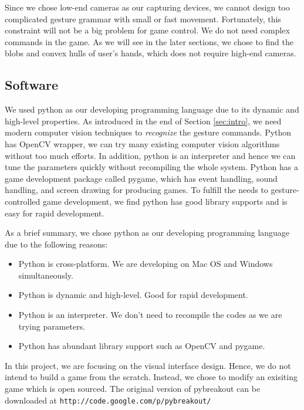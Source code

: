 \documentclass[10pt,twocolumn,letterpaper]{article}
\begin{document}
Since we chose low-end cameras as our capturing devices, we cannot design too 
complicated gesture grammar with small or fast movement. Fortunately, this 
constraint will not be a big problem for game control. We do not need complex 
commands in the game. As we will see in the later sections, we chose to find the 
blobs and convex hulls of user's hands, which does not require high-end cameras. 

\subsection{Software}
We used python as our developing programming language due to 
its dynamic and high-level properties. As introduced in the end 
of Section \ref{sec:intro}, we need modern computer vision 
techniques to \emph{recognize} the gesture commands. 
Python has OpenCV wrapper, we can try many existing computer vision 
algorithms without too much efforts. In addition, python 
is an interpreter and hence we can tune 
the parameters quickly without recompiling the whole system. 
Python has a game development package called pygame, which 
has event handling, sound handling, and screen drawing for producing 
games. To fulfill the needs to gesture-controlled game development, 
we find python has good library supports and is easy for rapid development.

As a brief summary, we chose python as our developing programming 
language due to the following reasons:
\begin{itemize}
	\item Python is cross-platform. We are developing on Mac OS and Windows simultaneously.
	\item Python is dynamic and high-level. Good for rapid development.
	\item Python is an interpreter. We don't need to recompile the codes as we are trying parameters.
	\item Python has abundant library support such as OpenCV and pygame. 
\end{itemize}

In this project, we are focusing on the visual interface 
design. Hence, we do not intend to build a game from the scratch. 
Instead, we chose to modify an exisiting game which is open sourced. 
The original version of pybreakout can be downloaded at
\verb"http://code.google.com/p/pybreakout/"
\end{document}
